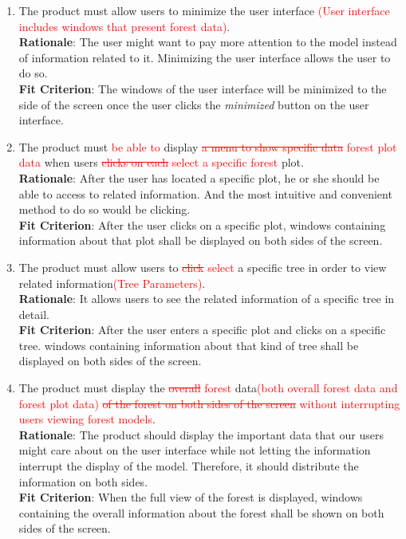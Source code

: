 \documentclass{article}
\begin{document}
\begin{enumerate}[FR1]
    \item The product must allow users to minimize the user interface\textcolor{red}{ (User 
    interface includes windows that present forest data)}. \\
    \textbf{Rationale}: The user might want to pay more attention to the model instead of information related to it. Minimizing the user interface allows the user to do so. \\
	\textbf{Fit Criterion}: The windows of the user interface will be minimized to the side of the screen once the user clicks the \textit{minimized} button on the user interface.
	
	\item The product must \textcolor{red}{be able to} display \textcolor{red}{\st{a menu to show
	 specific data} forest plot data} when users \textcolor{red}{\st{clicks on each} select
	 a specific forest} plot.\\
	\textbf{Rationale}: After the user has located a specific plot, he or she should be able to access to related information. And the most intuitive and convenient method to do so would be clicking. \\
	\textbf{Fit Criterion}: After the user clicks on a specific plot, windows containing information about that plot shall be displayed on both sides of the screen.
	
	\item The product must allow users to \textcolor{red}{\st{click} select} a specific tree in order
	 to view related information\textcolor{red}{(Tree Parameters)}.\\
	\textbf{Rationale}: It allows users to see the related information of a specific tree in detail.\\
	\textbf{Fit Criterion}: After the user enters a specific plot and clicks on a specific tree. windows containing information about that kind of tree shall be displayed on both sides of the screen. 
	
	\item The product must display the \textcolor{red}{\st{overall} forest} data\textcolor{red}{(both 
	overall forest data and forest plot data)} \textcolor{red}{\st{of the forest on both sides of the
	 screen} without interrupting users viewing forest models}.\\
	\textbf{Rationale}: The product should display the important data that our users might care about on the user interface while not letting the information interrupt the display of the model. Therefore, it should distribute the information on both sides.\\
	\textbf{Fit Criterion}: When the full view of the forest is displayed, windows containing the overall information about the forest shall be shown on both sides of the screen. 
	

\end{enumerate}
\end{document}
